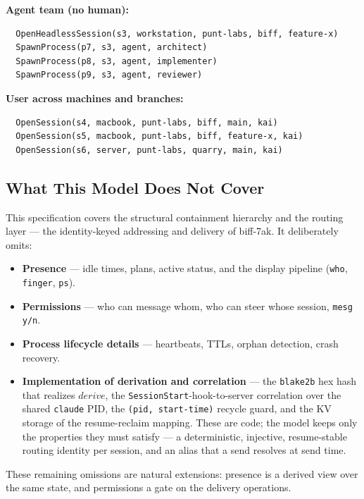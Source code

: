 \documentclass[a4paper,10pt,fleqn]{article}
\begin{document}
\noindent\textbf{Agent team (no human):}

\begin{verbatim}
  OpenHeadlessSession(s3, workstation, punt-labs, biff, feature-x)
  SpawnProcess(p7, s3, agent, architect)
  SpawnProcess(p8, s3, agent, implementer)
  SpawnProcess(p9, s3, agent, reviewer)
\end{verbatim}

\noindent\textbf{User across machines and branches:}

\begin{verbatim}
  OpenSession(s4, macbook, punt-labs, biff, main, kai)
  OpenSession(s5, macbook, punt-labs, biff, feature-x, kai)
  OpenSession(s6, server, punt-labs, quarry, main, kai)
\end{verbatim}

\subsection{What This Model Does Not Cover}

This specification covers the structural containment hierarchy and the
routing layer --- the identity-keyed addressing and delivery of
biff-7ak.  It deliberately omits:

\begin{itemize}
  \item \textbf{Presence} --- idle times, plans, active status, and the
    display pipeline (\texttt{who}, \texttt{finger}, \texttt{ps}).
  \item \textbf{Permissions} --- who can message whom, who can steer
    whose session, \texttt{mesg y/n}.
  \item \textbf{Process lifecycle details} --- heartbeats, TTLs, orphan
    detection, crash recovery.
  \item \textbf{Implementation of derivation and correlation} --- the
    \texttt{blake2b} hex hash that realizes $derive$, the
    \texttt{SessionStart}-hook-to-server correlation over the shared
    \texttt{claude} PID, the \texttt{(pid, start-time)} recycle guard,
    and the KV storage of the resume-reclaim mapping.  These are code;
    the model keeps only the properties they must satisfy --- a
    deterministic, injective, resume-stable routing identity per
    session, and an alias that a send resolves at send time.
\end{itemize}

These remaining omissions are natural extensions: presence is a derived
view over the same state, and permissions a gate on the delivery
operations.
\end{document}
